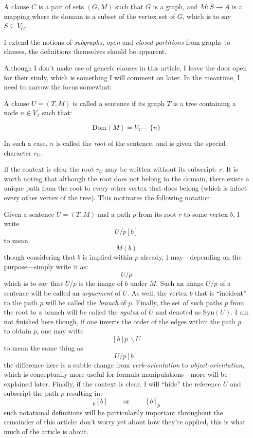 \documentclass[twoside]{article}
\newenvironment{definition}[1][Definition]{\begin{trivlist}
\item[\hskip \labelsep {\bfseries #1}]}{\end{trivlist}}
\begin{document}
\begin{definition}[Clause]

A clause $ C $ is a pair of sets $ (G, M) $ such that $ G $ is a graph, and $ M:S\to A $ is a mapping where its domain
is a subset of the vertex set of $ G $, which is to say $ S\subseteq V_G $.

\end{definition}
I extend the notions of \emph{subgraphs}, \emph{open} and \emph{closed partitions} from graphs to clauses,
the definitions themselves should be apparent.

Although I don't make use of generic clauses in this article, I leave the door open for their study,
which is something I will comment on later.  In the meantime, I need to narrow the focus somewhat:

\begin{definition}[Sentence]

A clause $ U=(T, M) $ is called a sentence if its graph $ T $ is a tree containing a node $ n\in V_T $ such that:

$$ \mbox{Dom}(M)=V_T-\{n\} $$

In such a case, $ n $ is called the \emph{root} of the sentence, and is given the special character $ r_U $.

\end{definition}
If the context is clear the root $ r_U $ may be written without its subscript: $ r $.
It is worth noting that although the root does not belong to the domain, there exists
a unique path from the root to every other vertex that does belong (which is infact
every other vertex of the tree).  This motivates the following notation:

Given a sentence $ U=(T, M) $ and a path $ p $ from its root $ r $ to some vertex $ b $, I write
$$ U/p[b] $$
to mean
$$ M(b) $$
though considering that $ b $ is implied within $ p $ already, I may---depending on the purpose---simply write it as:
$$ U/p $$
which is to say that $ U/p $ is the image of $ b $ under $ M $.  Such an image $ U/p $ of a sentence will be called an
\emph{arguement} of $ U $.  As well, the vertex $ b $ that is ``incident'' to the path $ p $ will be called the
\emph{branch} of $ p $.  Finally, the set of such paths $ p $ from the root to a branch will be called the \emph{syntax}
of $ U $ and denoted as $ \mbox{Syn}(U) $.  I am not finished here though, if one inverts the order of the edges within
the path $ p $ to obtain $ \bar{p} $, one may write
$$ [b]\bar{p}\,\backslash U $$
to mean the same thing as
$$ U/p[b] $$
the difference here is a subtle change from \emph{verb-orientation} to \emph{object-orientation},
which is conceptually more useful for formula manipulations---more will be explained later.  Finally,
if the context is clear, I will ``hide'' the reference $ U $ and subscript the path $ p $ resulting in:
$$ _p[b] \qquad\mbox{ or }\qquad [b]_{\bar{p}} $$
such notational definitions will be particularily important throughout the remainder of this article: don't worry
yet about how they're applied, this is what much of the article is about.
\end{document}
